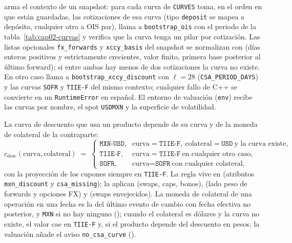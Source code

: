  arma el contexto de un snapshot: para cada curva de
\texttt{CURVES} toma, en el orden en que están guardadas, las cotizaciones de esa curva (tipo \texttt{deposit} se
mapea a depósito, cualquier otro a OIS par), llama a \texttt{bootstrap\_ois} con el periodo de la
tabla~\ref{tab:cap02-curvas} y verifica que la curva tenga un pilar por cotización. Las listas opcionales
\texttt{fx\_forwards} y \texttt{xccy\_basis} del snapshot se normalizan con
 (días enteros positivos y estrictamente crecientes, valor finito,
primera base posterior al último forward); si entre ambas hay menos de dos cotizaciones la curva
 no existe. En otro caso
 llama a \texttt{bootstrap\_xccy\_discount} con
$\ell = 28$ (\texttt{CSA\_PERIOD\_DAYS}) y las curvas \texttt{SOFR} y \texttt{TIIE-F} del mismo contexto; cualquier
fallo de C++ se convierte en un \texttt{RuntimeError} en español. El entorno de valuación
(\texttt{env}) recibe las curvas por nombre, el spot \texttt{USDMXN} y la superficie de volatilidad.

La curva de descuento que usa un producto depende de su curva y de la moneda de colateral de la contraparte:
\begin{equation}\label{eq:cap02-descuento}
  c_{\mathrm{desc}}(\text{curva},\text{colateral}) \;=\;
  \begin{cases}
    \texttt{MXN-USD}, & \text{curva}=\texttt{TIIE-F},\ \text{colateral}=\texttt{USD}\ \text{y la curva existe},\\
    \texttt{TIIE-F},  & \text{curva}=\texttt{TIIE-F}\ \text{en cualquier otro caso},\\
    \texttt{SOFR},    & \text{curva}=\texttt{SOFR}\ \text{con cualquier colateral,}
  \end{cases}
\end{equation}
con la proyección de los cupones siempre en \texttt{TIIE-F}. La regla vive en
 (atributos \texttt{mxn\_discount} y
\texttt{csa\_missing}); la aplican  (swaps, caps, bonos),
 (lado peso de forwards y opciones FX) y
 (swaps envejecidos). La moneda de colateral de una operación en una
fecha es la del último evento de cambio con fecha efectiva no posterior, y \texttt{MXN} si no hay ninguno
(); cuando el colateral es dólares y la curva no existe, el valor cae en
\texttt{TIIE-F} y, si el producto depende del descuento en pesos, la valuación añade el aviso
\texttt{no\_csa\_curve} ().

